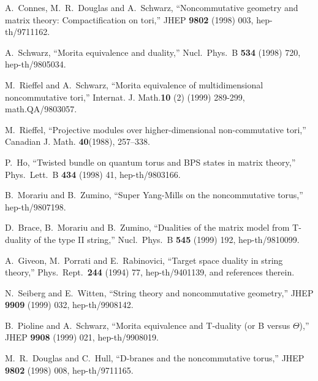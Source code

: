 \documentclass[a4paper,12pt]{article}
\begin{document}
\begin{thebibliography}{99}



A.~Connes, M.~R.~Douglas and A.~Schwarz,
``Noncommutative geometry and matrix theory: Compactification on tori,''
JHEP {\bf 9802} (1998) 003, 
hep-th/9711162.



A.~Schwarz, 
``Morita equivalence and duality,'' 
Nucl.\ Phys.\ B {\bf 534} (1998) 720, 
hep-th/9805034.



 M.~Rieffel and A.~Schwarz, 
``Morita equivalence of multidimensional noncommutative tori,'' 
Internat. J. Math.{\bf 10} (2) (1999) 289-299,
math.QA/9803057.



M.~Rieffel,
``Projective modules over higher-dimensional 
non-commutative tori,''
Canadian J. Math. {\bf 40}(1988), 257--338.



P.~Ho,
``Twisted bundle on quantum torus and BPS states in matrix theory,''
Phys.\ Lett.\ B {\bf 434} (1998) 41, 
hep-th/9803166.



B.~Morariu and B.~Zumino,
``Super Yang-Mills on the noncommutative torus,''
hep-th/9807198.



D.~Brace, B.~Morariu and B.~Zumino,
``Dualities of the matrix model from T-duality of the type II string,''
Nucl.\ Phys.\ B {\bf 545} (1999) 192, 
hep-th/9810099.



A.~Giveon, M.~Porrati and E.~Rabinovici,
``Target space duality in string theory,''
Phys.\ Rept.\  {\bf 244} (1994) 77,
hep-th/9401139, and references therein. 



  N.~Seiberg and E.~Witten, 
``String theory and noncommutative geometry,''
JHEP {\bf 9909} (1999) 032,
hep-th/9908142.



B.~Pioline and A.~Schwarz, 
``Morita equivalence and T-duality (or B versus $\Theta$),'' 
JHEP {\bf 9908} (1999) 021, 
hep-th/9908019.



M.~R.~Douglas and C.~Hull,
``D-branes and the noncommutative torus,'' 
JHEP {\bf 9802} (1998) 008, 
hep-th/9711165.




\end{thebibliography}
\end{document}
